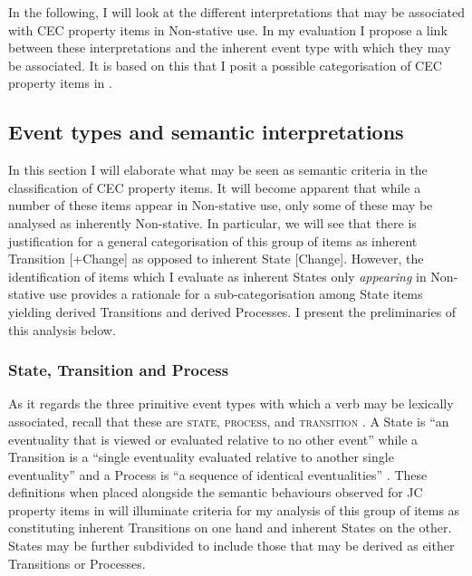 In the following, I will look at the different interpretations that may be associated with CEC property items in Non-stative use. In my evaluation I propose a link between these interpretations and the inherent event type with which they may be associated. It is based on this that I posit a possible categorisation of CEC property items in . 


\subsection{Event types and semantic interpretations}\label{sec:5.1.3}

In this section I will elaborate what may be seen as semantic criteria in the classification of CEC property items. It will become apparent that while a number of these items appear in Non-stative use, only some of these may be analysed as inherently Non-stative. In particular, we will see that there is justification for a general categorisation of this group of items as inherent Transition [+Change] as opposed to inherent State [\textminus Change]. However, the identification of items which I evaluate as inherent States only \textit{appearing} in Non-stative use provides a rationale for a sub-categorisation among State items yielding derived Transitions and derived Processes. I present the preliminaries of this analysis below.

\subsubsection{State, Transition and Process}\label{sec:5.1.3.1}

As it regards the three primitive event types with which a verb may be lexically associated, recall that these are \textsc{state, process}, and \textsc{transition} \citep{Pustejovsky1988,Pustejovsky1991}. A State is “an eventuality that is viewed or evaluated relative to no other event'' while a Transition is a “single eventuality evaluated relative to another single eventuality'' and a Process is “a sequence of identical eventualities'' \citep[22--23]{Pustejovsky1988}. These definitions when placed alongside the semantic behaviours observed for JC property items in  will illuminate criteria for my analysis of this group of items as constituting inherent Transitions on one hand and inherent States on the other. States may be further subdivided to include those that may be derived as either Transitions or Processes.

